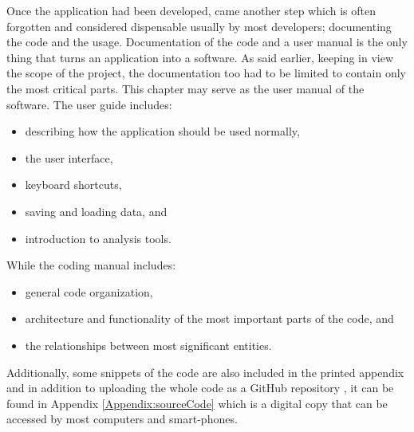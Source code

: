 {    Once the application had been developed, came another step which is often forgotten and considered dispensable usually by most developers; documenting the code and the usage. Documentation of the code and a user manual is the only thing that turns an application into a software. As said earlier, keeping in view the scope of the project, the documentation too had to be limited to contain only the most critical parts. This chapter may serve as the user manual of the software. The user guide includes:
    \begin{itemize}
      \item describing how the application should be used normally,
      \item the user interface,
      \item keyboard shortcuts,
      \item saving and loading data, and
      \item introduction to analysis tools.
    \end{itemize}
    While the coding manual includes:
    \begin{itemize}
      \item general code organization,
      \item architecture and functionality of the most important parts of the code, and
      \item the relationships between most significant entities.
    \end{itemize}
    Additionally, some snippets of the code are also included in the printed appendix and in addition to uploading the whole code as a GitHub repository \cite{bib20}, it can be found in Appendix \ref{Appendix:sourceCode} which is a digital copy that can be accessed by most computers and smart-phones.
}

